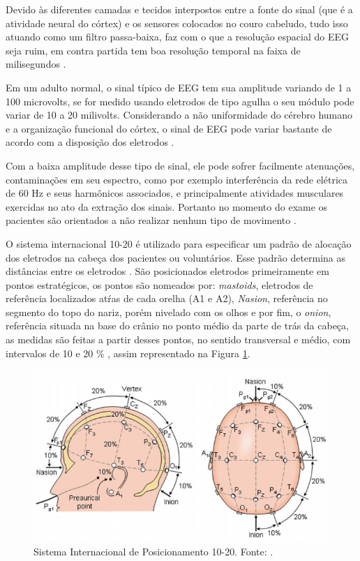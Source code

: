 Devido às diferentes camadas e tecidos interpostos entre a fonte do sinal (que é a atividade neural do córtex) e os sensores colocados no couro cabeludo, tudo isso atuando como um filtro passa-baixa, faz com o que a resolução 
espacial do EEG seja ruim, em contra partida tem boa resolução temporal na faixa de milisegundos \cite{raobrain}.
 
Em um adulto normal, o sinal típico de EEG tem sua amplitude variando de 1 a 100 microvolts, se for medido usando eletrodos de tipo agulha o seu módulo pode variar de 10 a 20 milivolts. Considerando a não uniformidade do cérebro humano e a organização funcional do córtex, o sinal de EEG pode variar bastante de acordo com a disposição dos eletrodos \cite{SIULYDissertacao}.

Com a baixa amplitude desse tipo de sinal, ele pode sofrer facilmente atenuações, contaminações em seu espectro, como por exemplo interferência da rede elétrica de 60 Hz e seus harmônicos associados, e principalmente atividades musculares exercidas no ato da extração dos sinais. Portanto no momento do exame os pacientes são orientados a não realizar nenhum tipo de movimento \cite{raobrain}.

 O sistema internacional 10-20 é utilizado para especificar um padrão de alocação dos eletrodos na cabeça dos pacientes ou voluntários. Esse padrão determina as distâncias entre os eletrodos \cite{Siulybook}. São posicionados eletrodos primeiramente em pontos estratégicos, os pontos são nomeados por: \textit{mastoids}, eletrodos de referência localizados atŕas de cada orelha (A1 e A2), \textit{Nasion}, referência no segmento do topo do nariz, porém nivelado com os olhos e por fim, o \textit{onion}, referência situada na base do crânio no ponto médio da parte de trás da cabeça, as medidas são feitas a partir desses pontos, no sentido transversal e médio,  com intervalos de 10 e 20 \% \cite{raobrain}, assim representado na Figura \ref{padrao1020}.

\begin{figure}[h]
	\centering
	\includegraphics[scale=0.75]{figuras/padrao1020.png}
	\caption{Sistema Internacional de Posicionamento 10-20. Fonte: \cite{campisi2012eeg}.}
	\label{padrao1020}
\end{figure}


